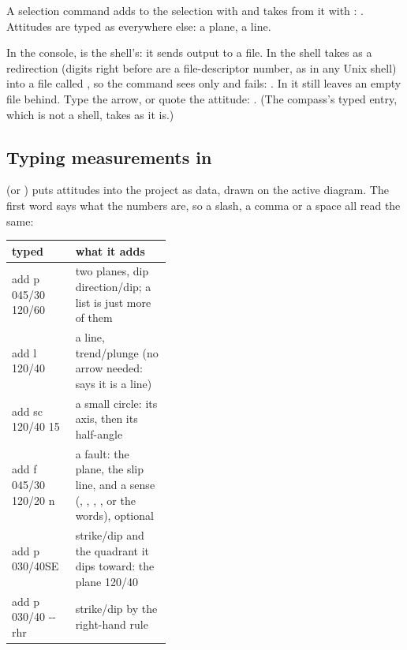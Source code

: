 A selection command adds to the selection with \code{+} and takes from it with \code{-}:
. Attitudes are typed as everywhere else:  a plane,
 a line.

\begin{caution}
In the console, \code{>} is the shell's: it sends output to a file. In 
the shell takes  as a redirection (digits right before \code{>} are a file-descriptor number,
as in any Unix shell) into a file called , so the command sees only  and
fails: . In  it still leaves an empty file
 behind. Type the arrow, or quote the attitude: . (The
compass's typed entry, which is not a shell, takes  as it is.)
\end{caution}

\subsection{Typing measurements in}\label{sec:add}

 (or ) puts attitudes into the project as data, drawn on the active diagram. The first word says what
the numbers are, so a slash, a comma or a space all read the same:

\begin{center}\small
\begin{tabularx}{\linewidth}{@{}>{\ttfamily\raggedright}p{0.4\linewidth}L@{}}\toprule
\normalfont\sffamily\bfseries typed & \sffamily\bfseries what it adds \\\midrule
add p 045/30 120/60 & two planes, dip direction/dip; a list is just more of them \\
add l 120/40 & a line, trend/plunge (no arrow needed:  says it is a line) \\
add sc 120/40 15 & a small circle: its axis, then its half-angle \\
add f 045/30 120/20 n & a fault: the plane, the slip line, and a sense (, , , , or the words), optional \\
add p 030/40SE & strike/dip and the quadrant it dips toward: the plane 120/40 \\
add p 030/40 -{}-rhr & strike/dip by the right-hand rule \\
\bottomrule\end{tabularx}
\end{center}

